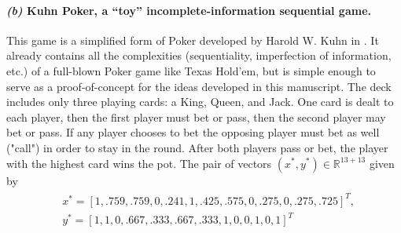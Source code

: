 \documentclass{article}
\begin{document}
\paragraph{\textit{(b)} Kuhn Poker, a ``toy'' incomplete-information
  sequential game.} This game is a simplified form of Poker
developed by Harold W. Kuhn in \cite{kuhn}. It already contains all
the complexities (sequentiality, imperfection of information, etc.) of
a full-blown Poker game like Texas Hold'em, but is simple enough to
serve as a proof-of-concept for the ideas developed in this
manuscript. The deck includes only three playing
cards: a King, Queen, and Jack. One card is dealt to each player, then
the first player must bet or pass, then the second player may bet or
pass. If any player chooses
to bet the opposing player must bet as well ("call") in order to stay
in the round. After both players pass or bet, the player with the
highest card wins the pot. %
The pair of vectors $(x^*, y^*) \in \mathbb{R}^{13 + 13}$ given by
\begin{eqnarray*}
  \begin{split}
    &x^* = [1, .759, .759, 0, .241, 1, .425, .575, 0, .275, 0,
      .275, .725]^T,\\
    &y^* = [1, 1, 0, .667, .333, .667, .333, 1, 0, 0, 1, 0, 1]^T
    \end{split}
\end{eqnarray*}
\end{document}
